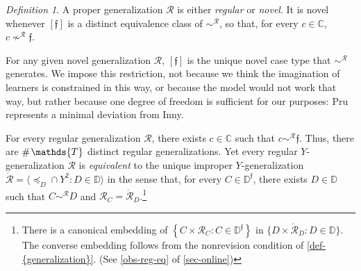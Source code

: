 \documentclass[ecta,nameyear,draft]{econsocart}
\makeatletter
\newcommand{\Ext}{\operatorname{ext}}
\newcommand{\countof}{\mathbin{\#}\hskip1pt}
\newcommand{\mc}{\mathcal}
\newcommand{\novel}{\mathfrak f}
\newcommand{\preceqb}{\mathbin{\preceq}}
\newcommand{\ext}{\mathrel{\mc R}}
\newcommand{\supext}{{\ext}}
\newcommand{\extb}{\mathbin{\mc R}}
\newcommand{\aext}{\mathrel{\acute{\mathrel{\mathcal R}}}}
\newcommand{\aextb}{\mathbin{\acute{\mathbin{\mathcal R}}}}
\newcommand{\mbbd}{{\mathds D}}
\newcommand{\mbbdp}{{\mathds D^{\novel}}}
\newcommand{\mbbc}{{\mathds C}}
\newcommand{\mbbt}{{\mathds {T}}}
\newcommand\ie{i\@.e\@ifnextchar.{}{.\@}}
\theoremstyle{plain}
\theoremstyle{remark}
\newtheorem*{definition*}{Definition}
\makeatother
\begin{document}

\begin{definition*}\label{def-novel}
  A proper {generalization} $\ext$ is either \emph{regular} or \emph{novel}. 
  It is novel whenever $[\novel]$ is a distinct equivalence class of
  $\sim^{\supext}$, so that, for every $c \in \mbbc$, $c \nsim^\supext \novel$.
\end{definition*}



For any given novel {generalization} $\ext$, $[\novel]$ is the unique novel
case type that $\sim^{\extb}$ generates.  We impose this restriction, not
because we think the imagination of learners is constrained in this way, or
because the model would not work that way, but rather because one degree of
freedom is sufficient for our purposes: {Pru} represents a minimal deviation
from Inny.


For every regular {generalization} $\ext$, there exists $c \in \mbbc$ such that
$c \sim^{\extb} \novel$. Thus, there are $\countof{\mbbt}$ distinct regular
{generalization}s. Yet every regular $Y$-{generalization} $\ext$ is
\emph{equivalent} to the unique improper
$Y$-{generalization} $\aext = \langle \preceqb_{D} \cap Y^{2}: D \in
\mbbd\rangle$ in the sense that, for every $C \in \mbbdp$, there exists $D \in
\mbbd$ such that $C \sim^{\extb} D$ and $\extb_{C} =
\aextb_{D}$.\footnote{There is a canonical embedding of $\left\{C \times
  \extb_{C}: C \in \mbbdp\right\}$
  in $\{D \times \aextb_{D}: D \in \mbbd\}$. The converse embedding follows
  from the nonrevision condition of \cref{def-{generalization}}. (See
\cref{obs-reg-eq} of \cref{sec-online})}
\end{document}
